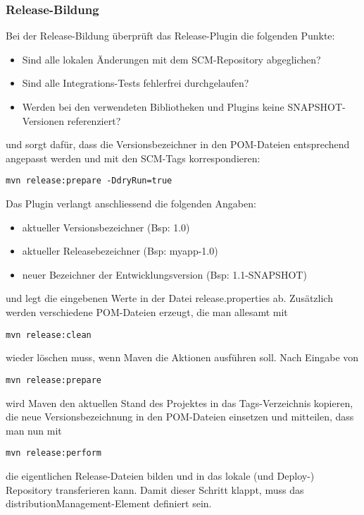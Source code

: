 \subsubsection{Release-Bildung}
Bei der Release-Bildung überprüft das Release-Plugin die folgenden Punkte:
\begin{itemize}
\item Sind alle lokalen Änderungen mit dem SCM-Repository abgeglichen?
\item Sind alle Integrations-Tests fehlerfrei durchgelaufen?
\item Werden bei den verwendeten Bibliotheken und Plugins
  keine SNAPSHOT-Versionen referenziert?
\end{itemize}
und sorgt dafür, dass die Versionsbezeichner in den POM-Dateien
entsprechend angepasst werden und mit den SCM-Tags korrespondieren:
\begin{lstlisting}
mvn release:prepare -DdryRun=true
\end{lstlisting}
\newslide
Das Plugin verlangt anschliessend die folgenden Angaben:
\begin{itemize}
\item aktueller Versionsbezeichner (Bsp: 1.0)
\item aktueller Releasebezeichner (Bsp: myapp-1.0)
\item neuer Bezeichner der Entwicklungsversion (Bsp: 1.1-SNAPSHOT)
\end{itemize}
und legt die eingebenen Werte in der Datei release.properties
ab. Zusätzlich werden verschiedene POM-Dateien erzeugt, die man
allesamt mit
\begin{lstlisting}
mvn release:clean
\end{lstlisting}
wieder löschen muss, wenn Maven die Aktionen ausführen soll.
\newslide
Nach Eingabe von
\begin{lstlisting}
mvn release:prepare
\end{lstlisting}
%
%
wird Maven den aktuellen Stand des Projektes in das Tags-Verzeichnis
kopieren, die neue Versionsbezeichnung
in den POM-Dateien einsetzen und mitteilen, dass man nun mit
\begin{lstlisting}
mvn release:perform
\end{lstlisting}
die eigentlichen Release-Dateien bilden und in das lokale (und
Deploy-) Repository
transferieren kann. Damit dieser Schritt klappt, muss das
distributionManagement-Element definiert sein.
%

